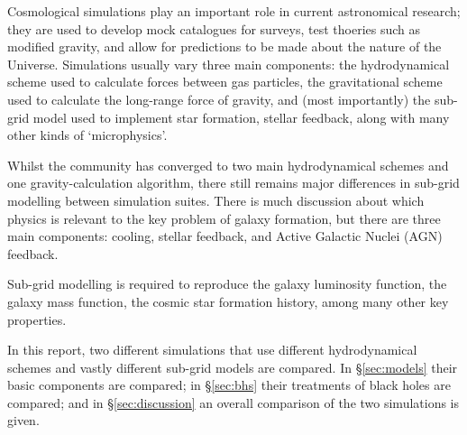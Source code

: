 Cosmological simulations play an important role in current astronomical
research; they are used to develop mock catalogues for surveys, test thoeries
such as modified gravity, and allow for predictions to be made about the
nature of the Universe. Simulations usually vary three main components:
the hydrodynamical scheme used to calculate forces between gas particles,
the gravitational scheme used to calculate the long-range force of gravity,
and (most importantly) the sub-grid model used to implement star formation,
stellar feedback, along with many other kinds of `microphysics'.

Whilst the community has converged to two main hydrodynamical schemes and one
gravity-calculation algorithm, there still remains major differences in
sub-grid modelling between simulation suites. There is much discussion about
which physics is relevant to the key problem of galaxy formation, but there
are three main components: cooling, stellar feedback, and Active Galactic
Nuclei (AGN) feedback.

Sub-grid modelling is required to reproduce the galaxy luminosity function,
the galaxy mass function, the cosmic star formation history, among many
other key properties.

In this report, two different simulations that use different hydrodynamical
schemes and vastly different sub-grid models are compared. In §\ref{sec:models}
their basic components are compared; in §\ref{sec:bhs} their treatments
of black holes are compared; and in §\ref{sec:discussion} an overall comparison
of the two simulations is given. 

